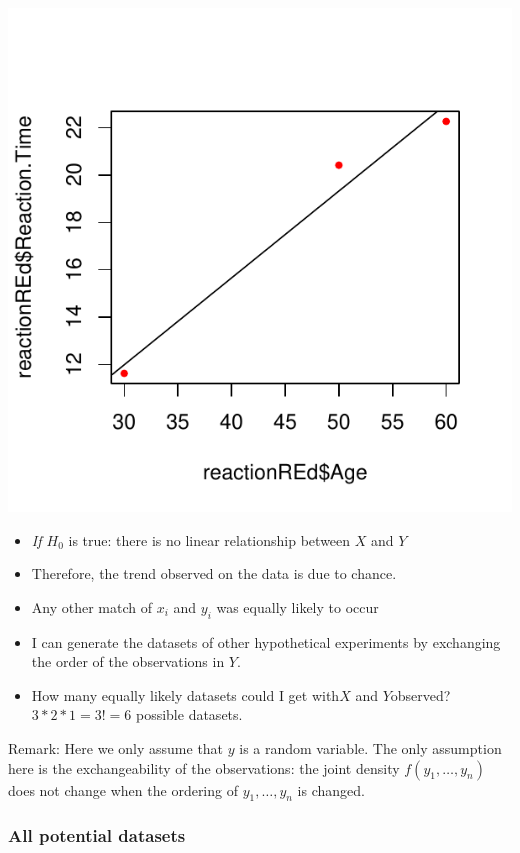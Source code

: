 \documentclass[
]{article}
\providecommand{\tightlist}{%
  \setlength{\itemsep}{0pt}\setlength{\parskip}{0pt}}
\begin{document}
\begin{center}\includegraphics{perm_files/figure-latex/unnamed-chunk-8-1} \end{center}

\begin{itemize}
\tightlist
\item
  \emph{If \(H_0\)} is true: there is no linear relationship between
  \(X\) and \(Y\)
\item
  Therefore, the trend observed on the data is due to chance.
\item
  Any other match of \(x_i\) and \(y_i\) was equally likely to occur
\item
  I can generate the datasets of other hypothetical experiments by
  exchanging the order of the observations in \(Y\).
\item
  How many equally likely datasets could I get with\(X\) and
  \(Y\)observed? \(3 * 2 * 1=3!=6\) possible datasets.
\end{itemize}

Remark: Here we only assume that \(y\) is a random variable. The only
assumption here is the exchangeability of the observations: the joint
density \(f(y_1,\ldots,y_n)\) does not change when the ordering of
\(y_1,\ldots,y_n\) is changed.

\hypertarget{all-potential-datasets}{%
\subsubsection{All potential datasets}\label{all-potential-datasets}}
\end{document}
